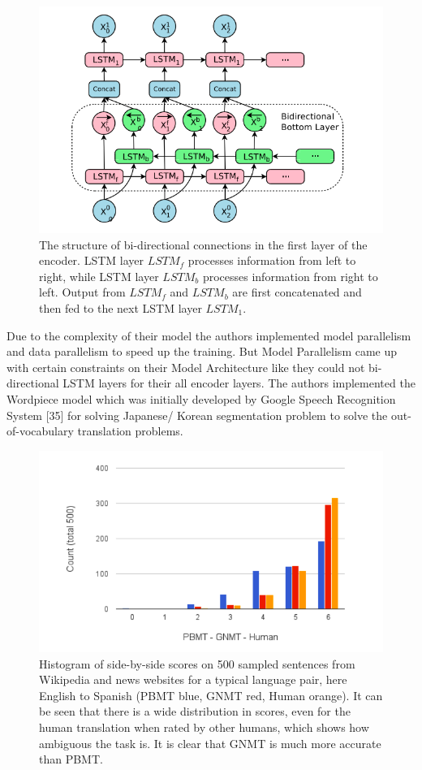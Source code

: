 \begin{figure}
\includegraphics[width=\textwidth]{figures/gnmt3.png}
\caption{The structure of bi-directional connections in the first layer of the encoder. LSTM layer $LSTM_f$
processes information from left to right, while LSTM layer $LSTM_b$ processes information from right to left.
Output from $LSTM_f$ and $LSTM_b$ are first concatenated and then fed to the next LSTM layer $LSTM_1$.} \label{fig1}
\end{figure}

Due to the complexity of their model the authors implemented model parallelism and data parallelism to speed up the training. But Model Parallelism came up with certain constraints on their Model Architecture like they could not bi-directional LSTM layers for their all encoder layers.  The authors implemented the Wordpiece model which was initially developed by Google Speech Recognition System [35] for solving Japanese/ Korean segmentation problem to solve the out-of-vocabulary translation problems. 

\begin{figure}
\includegraphics[width=\textwidth]{figures/gnmt4.png}
\caption{Histogram of side-by-side scores on 500 sampled sentences from Wikipedia and news websites for a
typical language pair, here English to Spanish (PBMT blue, GNMT red, Human orange). It can be seen that
there is a wide distribution in scores, even for the human translation when rated by other humans, which
shows how ambiguous the task is. It is clear that GNMT is much more accurate than PBMT.} \label{fig1}
\end{figure}

